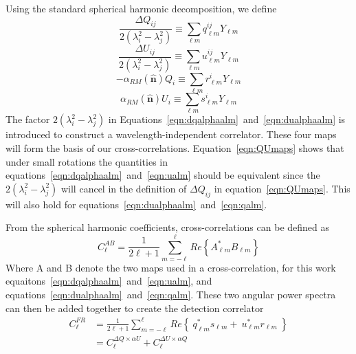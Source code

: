 \documentclass[usenatbib,hidelinks]{mnras}
\newcommand{\nhat}{\hat{\mathbf{n}}}
\begin{document}
{{ Using the standard spherical harmonic decomposition, we define
\begin{equation}
   \frac{\Delta Q_{ij}}{2(\lambda_{i}^{2}-\lambda_{j}^{2})} \equiv\sum_{\ell m} q_{\ell m}^{ij}Y_{\ell m}
  \label{eqn:dqalphaalm}
\end{equation}
\begin{equation}
  \frac{\Delta U_{ij}}{2(\lambda_{i}^{2}-\lambda_{j}^{2})} \equiv\sum_{\ell m} u_{\ell m}^{ij}Y_{\ell m}
   \label{eqn:dualphaalm}
\end{equation}
\begin{equation}
  -\alpha_{RM}(\nhat) Q_{i} \equiv \sum_{\ell m} r_{\ell m}^{i}Y_{\ell m} \label{eqn:qalm}
\end{equation}
\begin{equation}
    \alpha_{RM}(\nhat)U_{i} \equiv \sum_{\ell m} s_{\ell m}^{i}Y_{\ell m}
     \label{eqn:ualm}
 \end{equation}
The factor $2\left( \lambda_{i}^{2} - \lambda_{j}^{2} \right)$ in Equations~\ref{eqn:dqalphaalm}~and~\ref{eqn:dualphaalm} is introduced to construct a wavelength-independent correlator. These four maps will form the basis of our cross-correlations. Equation~\ref{eqn:QUmaps} shows that under small rotations the quantities in equations~\ref{eqn:dqalphaalm}~and~\ref{eqn:ualm} should be equivalent
since the $2\left( \lambda_{i}^{2} - \lambda_{j}^{2} \right)$ will cancel in the definition of $\Delta Q_{ij}$ in equation~\ref{eqn:QUmaps}. This will also hold for equations~\ref{eqn:dualphaalm}~and~\ref{eqn:qalm}.


From the spherical harmonic coefficients, cross-correlations can be defined as
\begin{equation}
 C_{\ell}^{AB} =\frac{1}{2\ell +1}\sum\limits_{m=-\ell}^{\ell}Re \left\lbrace A_{\ell m}^{*}B_{\ell m} \right\rbrace  \label{eqn:correlation}
 \end{equation}
Where A and B denote the two maps used in a cross-correlation, for this work equaitons~\ref{eqn:dqalphaalm}~and~\ref{eqn:ualm}, and equations~\ref{eqn:dualphaalm}~and~\ref{eqn:qalm}.
These two angular power spectra can then be added together to create the detection correlator
\begin{equation}
\begin{aligned}
C_{\ell}^{FR}&= \frac{1}{2\ell + 1} \sum_{m=-\ell}^{\ell} Re \left\lbrace \  q_{\ell m}^{*}s_{\ell m} + \ u_{\ell m}^{*}r_{\ell m} \   \right\rbrace \\
 &= C_{\ell}^{\Delta Q \times \alpha U} + C_{\ell}^{\Delta U \times \alpha Q}  \label{eqn:correlator} 
 \end{aligned}
\end{equation}

}}
\end{document}
